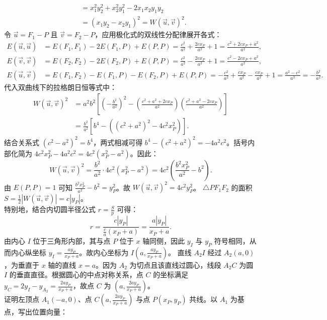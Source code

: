 \begin{solution}
\begin{align*}
&= x_1^2 y_2^2 + x_2^2 y_1^2 - 2x_1 x_2 y_1 y_2 \\
&= (x_1 y_2 - x_2 y_1)^2 = W(\vec{u}, \vec{v})^2.
\end{align*}
令 $\vec{u} = F_1 - P$ 且 $\vec{v} = F_2 - P$，应用极化式的双线性分配律展开各式：
\begin{align*}
E(\vec{u}, \vec{u}) &= E(F_1, F_1) - 2E(F_1, P) + E(P, P) = \frac{c^2}{a^2} + \frac{2cx_P}{a^2} + 1 = \frac{c^2 + 2cx_P + a^2}{a^2}, \\
E(\vec{v}, \vec{v}) &= E(F_2, F_2) - 2E(F_2, P) + E(P, P) = \frac{c^2}{a^2} - \frac{2cx_P}{a^2} + 1 = \frac{c^2 - 2cx_P + a^2}{a^2}, \\
E(\vec{u}, \vec{v}) &= E(F_1, F_2) - E(F_1, P) - E(F_2, P) + E(P, P) = -\frac{c^2}{a^2} + \frac{cx_P}{a^2} - \frac{cx_P}{a^2} + 1 = \frac{a^2 - c^2}{a^2} = -\frac{b^2}{a^2}.
\end{align*}
代入双曲线下的拉格朗日恒等式中：
\begin{align*}
W(\vec{u}, \vec{v})^2 &= a^2b^2 \left[ \left(-\frac{b^2}{a^2}\right)^2 - \left(\frac{c^2+a^2+2cx_P}{a^2}\right)\left(\frac{c^2+a^2-2cx_P}{a^2}\right) \right] \\
&= \frac{b^2}{a^2} \left[ b^4 - \left( (c^2+a^2)^2 - 4c^2x_P^2 \right) \right].
\end{align*}
结合关系式 $(c^2-a^2)^2 = b^4$，两式相减可得 $b^4 - (c^2+a^2)^2 = -4a^2c^2$。括号内部化简为 $4c^2x_P^2 - 4a^2c^2 = 4c^2(x_P^2 - a^2)$。因此：
\[ W(\vec{u}, \vec{v})^2 = \frac{b^2}{a^2} \cdot 4c^2(x_P^2 - a^2) = 4c^2 \left( \frac{b^2 x_P^2}{a^2} - b^2 \right). \]
由 $E(P,P) = 1$ 可知 $\frac{b^2x_P^2}{a^2} - b^2 = y_P^2$。故 $W(\vec{u}, \vec{v})^2 = 4c^2y_P^2$。
$\triangle PF_1F_2$ 的面积 $S = \frac{1}{2}|W(\vec{u}, \vec{v})| = c|y_P|$。\\
特别地，结合内切圆半径公式 $r = \frac{S}{p}$ 可得：
\[ r = \frac{c|y_P|}{\frac{c}{a}(x_P + a)} = \frac{a|y_P|}{x_P + a}. \]
由内心 $I$ 位于三角形内部，其与点 $P$ 位于 $x$ 轴同侧，因此 $y_I$ 与 $y_P$ 符号相同，从而内心纵坐标 $y_I = \frac{a y_P}{x_P + a}$。故内心坐标为 $I \left( a, \frac{a y_P}{x_P + a} \right)$。
直线 $A_2I$ 经过 $A_2(a, 0)$，为垂直于 $x$ 轴的直线 $x = a$。因为 $A_2$ 为切点且该直线过圆心，线段 $A_2C$ 为圆 $I$ 的垂直直径。根据圆心的中点对称关系，点 $C$ 的坐标满足 $y_C = 2y_I - y_{A_2} = \frac{2a y_P}{x_P + a}$，故点 $C$ 为 $\left( a, \frac{2a y_P}{x_P + a} \right)$。\\
证明左顶点 $A_1(-a, 0)$、点 $C \left( a, \frac{2a y_P}{x_P + a} \right)$ 与点 $P(x_P, y_P)$ 共线。以 $A_1$ 为基点，写出位置向量：
\begin{align*}

\end{align*}
\end{solution}
